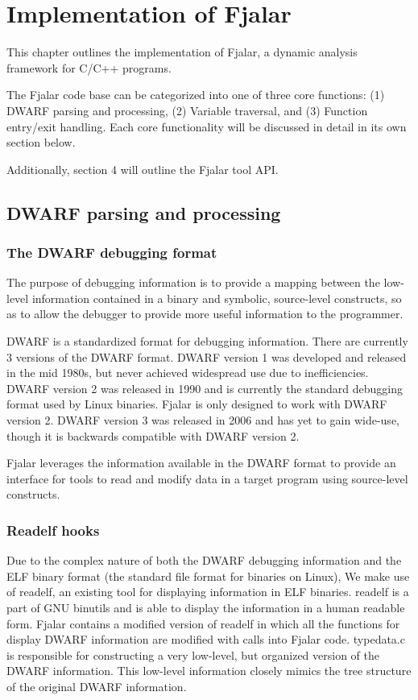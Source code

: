 \documentclass[11pt]{article}
\begin{document}
\chapter{Implementation of Fjalar}
This chapter outlines the implementation of Fjalar, a dynamic analysis
framework for C/C++ programs. 

The Fjalar code base can be categorized into one of three core
functions: (1) DWARF parsing and processing, (2) Variable
traversal, and (3) Function entry/exit handling. Each core
functionality will be discussed in detail in its own section below.

Additionally, section 4 will outline the Fjalar tool API.

\section{DWARF parsing and processing}

\subsection{The DWARF debugging format}
The purpose of debugging information is to provide a mapping between
the low-level information contained in a binary and symbolic,
source-level constructs, so as to allow the debugger to provide more
useful information to the programmer.

DWARF is a standardized format for debugging information. There are currently
3 versions of the DWARF format. DWARF version 1 was developed and
released in the mid 1980s, but never achieved widespread use due to
inefficiencies. DWARF version 2 was released in 1990 and is currently
the standard debugging format used by Linux binaries. Fjalar is
only designed to work with DWARF version 2. DWARF version 3 was
released in 2006 and has yet to gain wide-use, though it is backwards
compatible with DWARF version 2.

Fjalar leverages the information available in the DWARF format to
provide an interface for tools to read and modify data in a target
program using source-level constructs.


\subsection{Readelf hooks}
Due to the complex nature of both the DWARF debugging information and
the ELF binary format (the standard file format for binaries on Linux),
We make use of readelf, an existing tool for displaying information in
ELF binaries. readelf is a part of GNU binutils and is able to display
the information in a human readable form. Fjalar contains a modified
version of readelf in which all the functions for display DWARF
information are modified with calls into Fjalar code. typedata.c is
responsible for constructing a very low-level, but organized version
of the DWARF information. This low-level information closely mimics
the tree structure of the original DWARF information.
\end{document}

